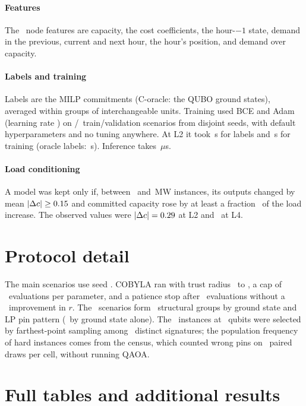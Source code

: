 \documentclass[10pt,conference]{IEEEtran}
\begin{document}
\paragraph{Features} The \GCNNFeatures\ node features are capacity, the cost coefficients, the hour-$-1$ state, demand in the previous, current and next hour, the hour's position, and demand over capacity.

\paragraph{Labels and training} Labels are the MILP commitments (C-oracle: the QUBO ground states), averaged within groups of interchangeable units. Training used BCE and Adam (learning rate \GCNLr) on \GCNNTrain/\GCNNVal\ train/validation scenarios from disjoint seeds, with default hyperparameters and no tuning anywhere. At L2 it took \GCNLabelsMilpLtwo\,s for labels and \GCNTrainMilpLtwo\,s for training (oracle labels: \GCNLabelsOracleLtwo\,s). Inference takes \GCNInferUsLtwo\,$\mu$s.

\paragraph{Load conditioning} A model was kept only if, between \LoadProbeLow\ and \LoadProbeHigh\,MW instances, its outputs changed by mean $|\Delta c|\geq0.15$ and committed capacity rose by at least a fraction \LoadCondFrac\ of the load increase. The observed values were $|\Delta c|=0.29$ at L2 and \GCNLoadDiffLfour\ at L4.

\section{Protocol detail}

The main scenarios use seed \ScenSeed. COBYLA ran with trust radius \RhoBeg\ to \RhoEnd, a cap of \CapPerParam\ evaluations per parameter, and a patience stop after \Patience\ evaluations without a \MinDelta\ improvement in $r$. The \NScen\ scenarios form \NGroupsGL\ structural groups by ground state and LP pin pattern (\NGroupsG\ by ground state alone). The \LfourNStruct\ instances at \NLfour\ qubits were selected by farthest-point sampling among \LfourPoolSignatures\ distinct signatures; the population frequency of hard instances comes from the census, which counted wrong pins on \NCensus\ paired draws per cell, without running QAOA.

\section{Full tables and additional results}
\end{document}
